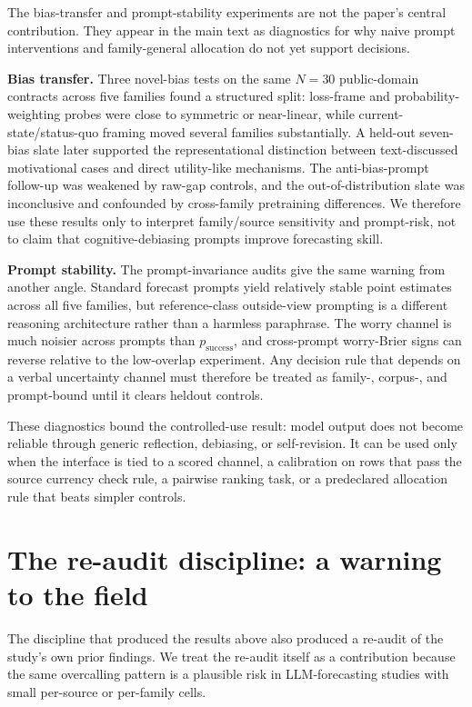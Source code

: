 \documentclass[11pt]{article}
\begin{document}
The bias-transfer and prompt-stability experiments are not the paper's central contribution. They appear in the main text as diagnostics for why naive prompt interventions and family-general allocation do not yet support decisions.

\textbf{Bias transfer.} Three novel-bias tests on the same \(N=30\) public-domain contracts across five families found a structured split: loss-frame and probability-weighting probes were close to symmetric or near-linear, while current-state/status-quo framing moved several families substantially. A held-out seven-bias slate later supported the representational distinction between text-discussed motivational cases and direct utility-like mechanisms. The anti-bias-prompt follow-up was weakened by raw-gap controls, and the out-of-distribution slate was inconclusive and confounded by cross-family pretraining differences. We therefore use these results only to interpret family/source sensitivity and prompt-risk, not to claim that cognitive-debiasing prompts improve forecasting skill.

\textbf{Prompt stability.} The prompt-invariance audits give the same warning from another angle. Standard forecast prompts yield relatively stable point estimates across all five families, but reference-class outside-view prompting is a different reasoning architecture rather than a harmless paraphrase. The worry channel is much noisier across prompts than \(p_{\text{success}}\), and cross-prompt worry-Brier signs can reverse relative to the low-overlap experiment. Any decision rule that depends on a verbal uncertainty channel must therefore be treated as family-, corpus-, and prompt-bound until it clears heldout controls.

These diagnostics bound the controlled-use result: model output does not become reliable through generic reflection, debiasing, or self-revision. It can be used only when the interface is tied to a scored channel, a calibration on rows that pass the source currency check rule, a pairwise ranking task, or a predeclared allocation rule that beats simpler controls.

\section{The re-audit discipline: a warning to the field}
\label{sec:reaudit}

The discipline that produced the results above also produced a re-audit of the study's own prior findings. We treat the re-audit itself as a contribution because the same overcalling pattern is a plausible risk in LLM-forecasting studies with small per-source or per-family cells.
\end{document}
